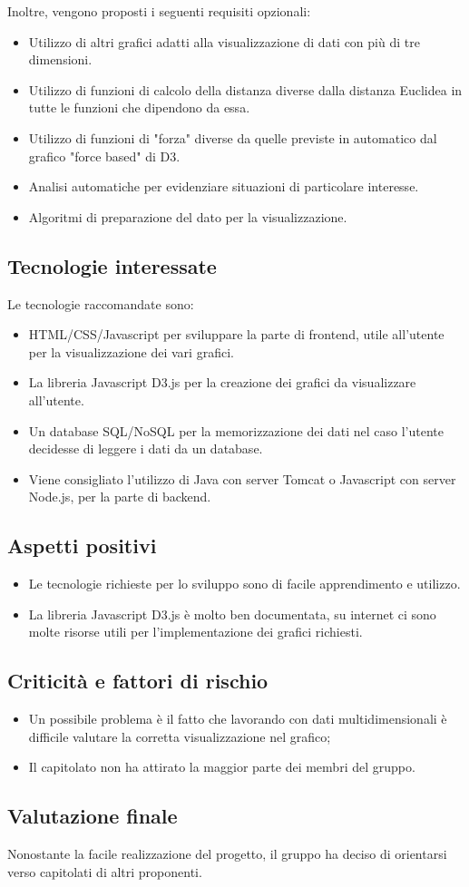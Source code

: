 Inoltre, vengono proposti i seguenti requisiti opzionali:
\begin{itemize}
\item Utilizzo di altri grafici adatti alla visualizzazione di dati con più di tre dimensioni.
\item Utilizzo di funzioni di calcolo della distanza diverse dalla distanza Euclidea in tutte le funzioni che dipendono da essa.
\item Utilizzo di funzioni di "forza" diverse da quelle previste in automatico dal grafico "force based" di D3.
\item Analisi automatiche per evidenziare situazioni di particolare interesse.
\item Algoritmi di preparazione del dato per la visualizzazione.
\end{itemize}

\subsection{Tecnologie interessate}
Le tecnologie raccomandate sono:
\begin{itemize}
\item HTML/CSS/Javascript per sviluppare la parte di frontend, utile all'utente per la visualizzazione dei vari grafici.
\item La libreria Javascript D3.js per la creazione dei grafici da visualizzare all'utente.
\item Un database SQL/NoSQL per la memorizzazione dei dati nel caso l'utente decidesse di leggere i dati da un database.
\item Viene consigliato l’utilizzo di Java con server Tomcat o Javascript con server Node.js, per la parte di backend.
\end{itemize}

\subsection{Aspetti positivi}
\begin{itemize}
\item Le tecnologie richieste per lo sviluppo sono di facile apprendimento e utilizzo.
\item La libreria Javascript D3.js è molto ben documentata, su internet ci sono molte risorse utili per l'implementazione dei grafici richiesti.
\end{itemize}

\subsection{Criticità e fattori di rischio}
\begin{itemize}
\item Un possibile problema è il fatto che lavorando con dati multidimensionali è difficile valutare la corretta visualizzazione nel grafico;
\item Il capitolato non ha attirato la maggior parte dei membri del gruppo.
\end{itemize}

\subsection{Valutazione finale}
Nonostante la facile realizzazione del progetto, il gruppo ha deciso di orientarsi verso capitolati di altri proponenti.